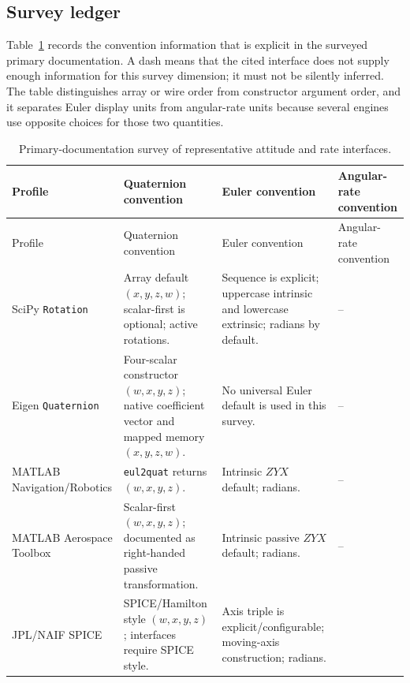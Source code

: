 \documentclass[11pt]{article}
\begin{document}
    \subsection{Survey ledger}

    Table~\ref{tab:domain-survey-ledger} records the convention information that is explicit
    in the surveyed primary documentation. A dash means that the cited interface does not
    supply enough information for this survey dimension; it must not be silently inferred.
    The table distinguishes array or wire order from constructor argument order, and it
    separates Euler display units from angular-rate units because several engines use
    opposite choices for those two quantities.

    \begingroup
    \scriptsize
    \setlength{\tabcolsep}{2.6pt}
    \begin{longtable}{@{}p{}p{}p{}p{}@{}}
        \caption{Primary-documentation survey of representative attitude and rate interfaces.}\label{tab:domain-survey-ledger}\\
        \toprule
        Profile & Quaternion convention & Euler convention & Angular-rate convention \\
        \midrule
        \endfirsthead
        \toprule
        Profile & Quaternion convention & Euler convention & Angular-rate convention \\
        \midrule
        \endhead
        \bottomrule
        \endlastfoot
        SciPy \texttt{Rotation}
        & Array default $(x,y,z,w)$; scalar-first is optional; active rotations.
        & Sequence is explicit; uppercase intrinsic and lowercase extrinsic; radians by default.
        & -- \\
        Eigen \texttt{Quaternion}
        & Four-scalar constructor $(w,x,y,z)$; native coefficient vector and mapped memory $(x,y,z,w)$.
        & No universal Euler default is used in this survey.
        & -- \\
        MATLAB Navigation/Robotics
        & \texttt{eul2quat} returns $(w,x,y,z)$.
        & Intrinsic $ZYX$ default; radians.
        & -- \\
        MATLAB Aerospace Toolbox
        & Scalar-first $(w,x,y,z)$; documented as right-handed passive transformation.
        & Intrinsic passive $ZYX$ default; radians.
        & -- \\
        JPL/NAIF SPICE
        & SPICE/Hamilton style $(w,x,y,z)$; interfaces require SPICE style.
        & Axis triple is explicit/configurable; moving-axis construction; radians.

\end{longtable}
\end{document}
